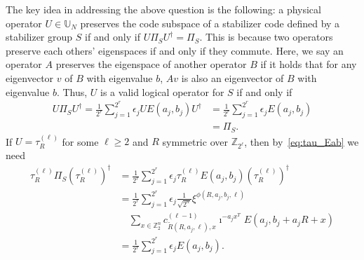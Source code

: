 \documentclass[twoside,romanappendices]{IEEEtran}
\newcommand{\MZ}{\mathbb{Z}}
\newcommand{\Fn}{\mathbb{Z}_2^n}
\begin{document}
The key idea in addressing the above question is the following: a physical operator $U \in \mathbb{U}_N$ preserves the code subspace of a stabilizer code defined by a stabilizer group $S$ if and only if $U \Pi_S U^{\dagger} = \Pi_S$.
This is because two operators preserve each others' eigenspaces if and only if they commute.
Here, we say an operator $A$ preserves the eigenspace of another operator $B$ if it holds that for any eigenvector $v$ of $B$ with eigenvalue $b$, $Av$ is also an eigenvector of $B$ with eigenvalue $b$.
Thus, $U$ is a valid logical operator for $S$ if and only if
\begin{align}
U \Pi_S U^{\dagger} = \frac{1}{2^r} \sum_{j = 1}^{2^r} \epsilon_j U E(a_j,b_j) U^{\dagger} & = \frac{1}{2^r} \sum_{j = 1}^{2^r} \epsilon_j E(a_j,b_j) \nonumber \\
%
  & = \Pi_S.
\end{align}
If $U = \tau_R^{(\ell)}$ for some $\ell \geq 2$ and $R$ symmetric over $\MZ_{2^\ell}$, then by~\eqref{eq:tau_Eab} we need
\begin{align}
\tau_R^{(\ell)} \Pi_S (\tau_R^{(\ell)})^{\dagger} & = \frac{1}{2^r} \sum_{j = 1}^{2^r} \epsilon_j \tau_R^{(\ell)} E(a_j,b_j) (\tau_R^{(\ell)})^{\dagger} \\
%
  & = \frac{1}{2^r} \sum_{j = 1}^{2^r} \epsilon_j \frac{1}{\sqrt{2^n}} \xi^{\phi(R,a_j,b_j,\ell)} \nonumber \\
%
  & \quad \sum_{x \in \Fn} c_{\tilde{R}(R,a_j,\ell),x}^{(\ell-1)} \imath^{-a_j x^T} E(a_j, b_j + a_j R + x) \\
%
  & = \frac{1}{2^r} \sum_{j = 1}^{2^r} \epsilon_j E(a_j,b_j).
\end{align}
\end{document}

